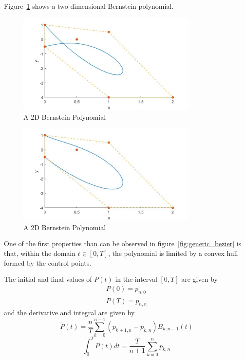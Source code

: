 \par Figure~\ref{fig:generic_bezier2D} shows a two dimensional Bernstein polynomial.


\begin{figure}[h!]
\centering
\includegraphics[width=0.8\textwidth]{Images/generic_bezier2D.jpg}
\caption{A 2D Bernstein Polynomial}
\label{fig:generic_bezier2D}
\end{figure}

\begin{figure}[h!]
\centering
\includegraphics[width=0.8\textwidth]{Images/generic_bezier2D_reordered.jpg}
\caption{A 2D Bernstein Polynomial}
\label{fig:generic_bezier2D_reordered}
\end{figure}


\par One of the first properties than can be observed in figure~\ref{fig:generic_bezier} is that, within the domain $t \in [0,T]$, the polynomial is limited by a convex hull formed by the control points.

\par The initial and final values of $P(t)$ in the interval $[0,T]$ are given by
\begin{equation}
    \label{eq:bern_in_fin}
    \begin{gathered}
        P(0) = p_{n,0} \\
        P(T) = p_{n,n}
    \end{gathered}
\end{equation}
and the derivative and integral are given by 
\begin{equation}
    \label{eq:bern_deriv}
    \dot{P}(t) = \frac{n}{T} \sum_{k=0}^{n-1} (p_{k+1,n} - p_{k,n}) B_{k,n-1}(t)
\end{equation}
\begin{equation}
    \label{eq:bern_int}
    \int_0^T P(t)dt = \frac{T}{n+1} \sum_{k=0}^{n} p_{k,n}
\end{equation}

